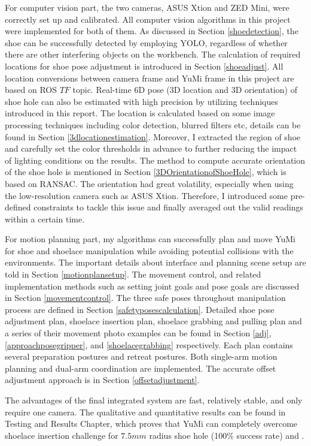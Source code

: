 For computer vision part, the two cameras, ASUS Xtion and ZED Mini, were correctly set up and calibrated. All computer vision algorithms in this project were implemented for both of them. As discussed in Section \ref{shoedetection}, the shoe can be successfully detected by employing YOLO, regardless of whether there are other interfering objects on the workbench. The calculation of required locations for shoe pose adjustment is introduced in Section \ref{shoeadjust}. All location conversions between camera frame and YuMi frame in this project are based on ROS $TF$ topic. Real-time 6D pose (3D location and 3D orientation) of shoe hole can also be estimated with high precision by utilizing techniques introduced in this report. The location is calculated based on some image processing techniques including color detection, blurred filters etc, details can be found in Section \ref{3dlocationestimation}. Moreover, I extracted the region of shoe and carefully set the color thresholds in advance to further reducing the impact of lighting conditions on the results. The method to compute accurate orientation of the shoe hole is mentioned in Section \ref{3DOrientationofShoeHole}, which is based on RANSAC. The orientation had great volatility, especially when using the low-resolution camera such as ASUS Xtion. Therefore, I introduced some pre-defined constraints to tackle this issue and finally averaged out the valid readings within a certain time.

For motion planning part, my algorithms can successfully plan and move YuMi for shoe and shoelace manipulation while avoiding potential collisions with the environments. The important details about interface and planning scene setup are told in Section \ref{motionplansetup}. The movement control, and related implementation methods such as setting joint goals and pose goals are discussed in Section \ref{movementcontrol}. The three safe poses throughout manipulation process are defined in Section \ref{safetyposescalculation}. Detailed shoe pose adjustment plan, shoelace insertion plan, shoelace grabbing and pulling plan and a series of their movement photo examples can be found in Section \ref{adj}, \ref{approachposegripper}, and \ref{shoelacegrabbing} respectively. Each plan contains several preparation postures and retreat postures. Both single-arm motion planning and dual-arm coordination are implemented. The accurate offset adjustment approach is in Section \ref{offsetadjustment}.

The advantages of the final integrated system are fast, relatively stable, and only require one camera. The qualitative and quantitative results can be found in Testing and Results Chapter, which proves that YuMi can completely overcome shoelace insertion challenge for $7.5mm$ radius shoe hole (100\% success rate) and .

